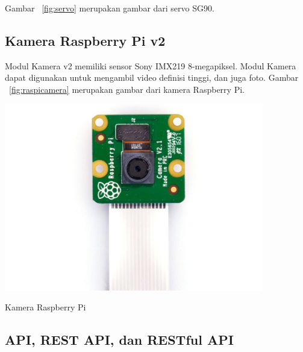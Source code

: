 Gambar ~\ref{fig:servo} merupakan gambar dari servo SG90.

\subsection{Kamera Raspberry Pi v2}
Modul Kamera v2 memiliki sensor Sony IMX219 8-megapiksel. Modul Kamera dapat digunakan untuk mengambil video definisi tinggi, dan juga foto. Gambar ~\ref{fig:raspicamera} merupakan gambar dari kamera Raspberry Pi.

\begin{afigure} 
    \includegraphics[width=0.85\textwidth, center]{images/raspicamera.jpg}
    \caption{ Kamera Raspberry Pi}
    \label{fig:raspicamera}
\end{afigure}

\subsection{API, REST API, dan RESTful API}

